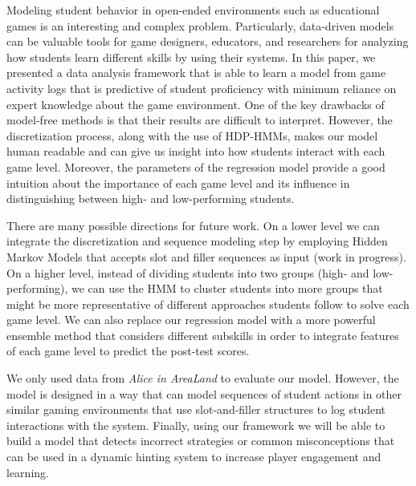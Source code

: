 \documentclass{sigchi}
\begin{document}
	Modeling student behavior in open-ended environments such as educational games is an interesting and complex problem. 
	Particularly, data-driven models can be valuable tools for game designers, educators, and researchers for analyzing how students learn different skills by using their systems.
	In this paper, we presented a data analysis framework that is able to learn a model from game activity logs that is predictive of student proficiency with minimum reliance on expert knowledge about the game environment. 
	One of the key drawbacks of model-free methods is that their results are difficult to interpret. 
	However, the discretization process, along with the use of HDP-HMMs, makes our model human readable and can give us insight into how students interact with each game level.
	Moreover, the parameters of the regression model provide a good intuition about the importance of each game level and its influence in distinguishing between high- and low-performing students.
	
	There are many possible directions for future work. On a lower level we can integrate the discretization and sequence modeling step by employing Hidden Markov Models that accepts slot and filler sequences as input (work in progress). On a higher level, instead of dividing students into two groups (high- and low-performing), we can use the HMM to cluster students \cite{bicego2003similarity,smyth1997clustering} into more groups that might be  more representative of different approaches students follow to solve each game level. We can also replace our regression model with a more powerful ensemble method that considers different subskills in order to integrate features of each game level to predict the post-test scores.
	
	We only used data from \textit{Alice in AreaLand} to evaluate our model. However, the model is designed in a way that can model sequences of student actions in other similar gaming environments that use slot-and-filler structures to log student interactions with the system. Finally, using our framework we will be able to build a model that detects incorrect strategies or common misconceptions that can be used in a dynamic hinting system to increase player engagement and learning.
	
	
	
	\balance
	
	
\end{document}
